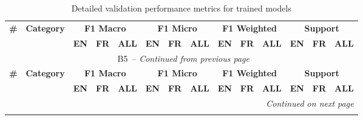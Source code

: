 {\footnotesize
{}
\setcounter{table}{4}
\renewcommand{\thetable}{B5}
\begin{longtable}{p{0.4cm}p{5.5cm}cccccccccccc}
\caption{Detailed validation performance metrics for trained models}
\label{tab:detailed_validation_metrics}
 \\
\toprule
\multirow{2}{*}{\textbf{\#}} & \multirow{2}{*}{\textbf{Category}} & \multicolumn{3}{c}{\textbf{F1 Macro}} & \multicolumn{3}{c}{\textbf{F1 Micro}} & \multicolumn{3}{c}{\textbf{F1 Weighted}} & \multicolumn{3}{c}{\textbf{Support}} \\
\cmidrule(lr){3-5} \cmidrule(lr){6-8} \cmidrule(lr){9-11} \cmidrule(lr){12-14}
& & \textbf{EN} & \textbf{FR} & \textbf{ALL} & \textbf{EN} & \textbf{FR} & \textbf{ALL} & \textbf{EN} & \textbf{FR} & \textbf{ALL} & \textbf{EN} & \textbf{FR} & \textbf{ALL} \\
\midrule
\endfirsthead
\multicolumn{14}{c}{\tablename\ \thetable\ -- \textit{Continued from previous page}} \\
\toprule
\multirow{2}{*}{\textbf{\#}} & \multirow{2}{*}{\textbf{Category}} & \multicolumn{3}{c}{\textbf{F1 Macro}} & \multicolumn{3}{c}{\textbf{F1 Micro}} & \multicolumn{3}{c}{\textbf{F1 Weighted}} & \multicolumn{3}{c}{\textbf{Support}} \\
\cmidrule(lr){3-5} \cmidrule(lr){6-8} \cmidrule(lr){9-11} \cmidrule(lr){12-14}
& & \textbf{EN} & \textbf{FR} & \textbf{ALL} & \textbf{EN} & \textbf{FR} & \textbf{ALL} & \textbf{EN} & \textbf{FR} & \textbf{ALL} & \textbf{EN} & \textbf{FR} & \textbf{ALL} \\
\midrule
\endhead
\midrule
\multicolumn{14}{r}{\textit{Continued on next page}} \\
\endfoot
\bottomrule
\endlastfoot


\end{longtable}}
